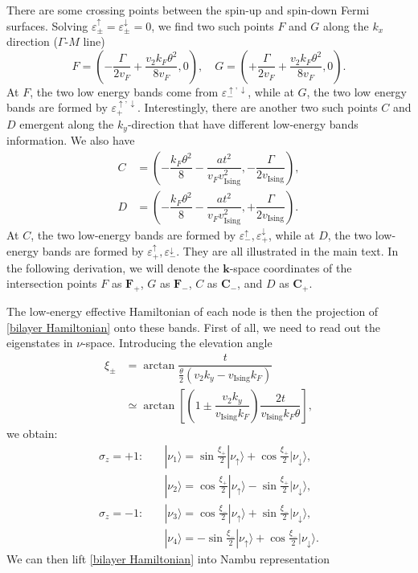 \begin{subappendices}
			There are some crossing points between the spin-up and spin-down Fermi surfaces. Solving $\varepsilon_\pm^\uparrow=\varepsilon_\pm^\downarrow=0$, we find two such points $F$ and $G$ along the $k_x$ direction ($\Gamma$-$M$ line)
			\begin{equation}\label{F,G coordinates withouth Delta and phi}
				F=\left(-\dfrac{\Gamma}{2v_F}+\dfrac{v_2k_F\theta^2}{8v_F}, 0\right),\quad G=\left(+\dfrac{\Gamma}{2v_F}+\dfrac{v_2k_F\theta^2}{8v_F}, 0\right).
			\end{equation}
			At $F$, the two low energy bands come from $\varepsilon_-^{\uparrow,\downarrow}$, while at $G$, the two low energy bands are formed by $\varepsilon_+^{\uparrow,\downarrow}$. Interestingly, there are another two such points $C$ and $D$ emergent along the $k_y$-direction that have different low-energy bands information. We also have
			\begin{align}
				C&=\left(-\dfrac{k_F\theta^2}{8}-\dfrac{a t^2}{v_Fv_{\text{Ising}}^2}, -\dfrac{\Gamma}{2v_{\text{Ising}}}\right),\label{C coordinates withouth Delta and phi}\\
				D&=\left(-\dfrac{k_F\theta^2}{8}-\dfrac{a t^2}{v_Fv_{\text{Ising}}^2}, +\dfrac{\Gamma}{2v_{\text{Ising}}}\right).\label{D coordinates withouth Delta and phi}
			\end{align}
			At $C$, the two low-energy bands are formed by $\varepsilon_-^\uparrow,\varepsilon_+^\downarrow$, while at $D$, the two low-energy bands are formed by $\varepsilon_+^\uparrow,\varepsilon_-^\downarrow$. They are all illustrated in the main text. In the following derivation, we will denote the $\bm{k}$-space coordinates of the intersection points $F$ as $\bm{F}_+$, $G$ as $\bm{F}_-$, $C$ as $\bm{C}_-$, and $D$ as $\bm{C}_+$.\par
			The low-energy effective Hamiltonian of each node is then the projection of \eqref{bilayer Hamiltonian} onto these bands. First of all, we need to read out the eigenstates in $\nu$-space. Introducing the elevation angle
			\begin{align*}
				\xi_\pm&=\arctan\dfrac{t}{\frac\theta 2(v_2k_y-v_{\text{Ising}} k_F)}\\
				&\simeq\arctan\left[\left(1\pm\dfrac{v_2k_y}{v_{\text{Ising}} k_F}\right)\dfrac{2t}{v_{\text{Ising}} k_F \theta}\right],
			\end{align*}
		    we obtain:
			\begin{align*}
				\sigma_z=+1:&\quad|\nu_1\rangle=\sin\frac{\xi_+}{2}|\nu_\uparrow\rangle+\cos\frac{\xi_+}{2}|\nu_\downarrow\rangle,\\
				&\quad|\nu_2\rangle=\cos\frac{\xi_+}{2}|\nu_\uparrow\rangle-\sin\frac{\xi_+}{2}|\nu_\downarrow\rangle,\\
				\sigma_z=-1:&\quad|\nu_3\rangle=\cos\frac{\xi_-}{2}|\nu_\uparrow\rangle+\sin\frac{\xi_-}{2}|\nu_\downarrow\rangle,\\
				&\quad|\nu_4\rangle=-\sin\frac{\xi_-}{2}|\nu_\uparrow\rangle+\cos\frac{\xi_-}{2}|\nu_\downarrow\rangle.
			\end{align*}
			We can then lift \eqref{bilayer Hamiltonian} into Nambu representation
			

\end{subappendices}
